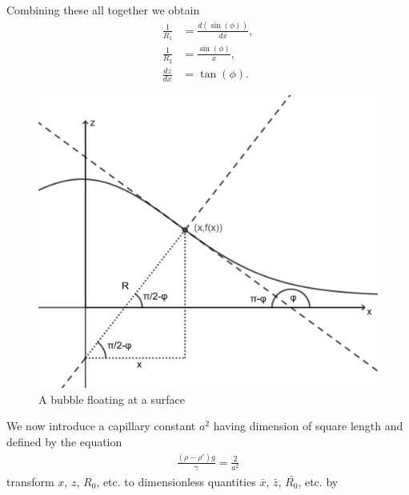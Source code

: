 Combining these all together we obtain
\begin{align}
    \frac{1}{R_1}&=\frac{d(\sin(\phi))}{dx},\\
    \frac{1}{R_2}&=\frac{\sin(\phi)}{x},\\
    \frac{dz}{dx} &= \tan(\phi).
\end{align}
\begin{figure}[hb]
    \centering
    \includegraphics[width=0.55\linewidth]{WriteUp/images/angles and trig.png}
    \caption{A bubble floating at a surface}
    \label{fig:4}
\end{figure}
We now introduce a capillary constant $a^2$ having dimension of square length and defined by the equation
\begin{align}
    \frac{(\rho-\rho')g}{\gamma} = \frac{2}{a^2}
\end{align}
transform $x$, $z$, $R_0$, etc. to dimensionless quantities $\bar{x}$, $\bar{z}$, $\bar{R_0}$, etc. by